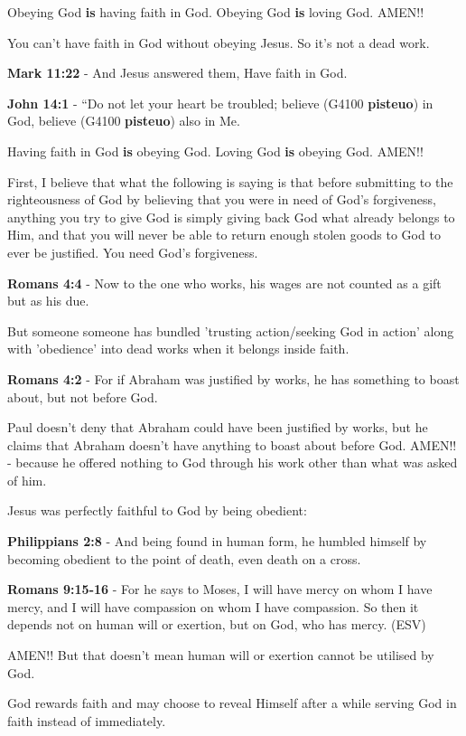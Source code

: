 \documentclass[11pt]{article}
\begin{document}
Obeying God \textbf{is} having faith in God. Obeying God \textbf{is} loving God. AMEN!!

You can't have faith in God without obeying Jesus. So it's not a dead work.

\textbf{Mark 11:22} - And Jesus answered them, Have faith in God.

\textbf{John 14:1} - “Do not let your heart be troubled; believe (G4100 \textbf{pisteuo}) in God, believe (G4100 \textbf{pisteuo}) also in Me.

Having faith in God \textbf{is} obeying God. Loving God \textbf{is} obeying God. AMEN!!

First, I believe that what the following is saying is that before submitting to the righteousness of God by believing that you were in need of God's forgiveness,
anything you try to give God is simply giving back God what already belongs to Him, and that you will never be able to return enough stolen goods to God to ever be justified.
You need God's forgiveness.

\textbf{Romans 4:4} - Now to the one who works, his wages are not counted as a gift but as his due.

But someone someone has bundled 'trusting
action/seeking God in action' along with
'obedience' into dead works when it belongs inside
faith.

\textbf{Romans 4:2} - For if Abraham was justified by works, he has something to boast about, but not before God.

Paul doesn't deny that Abraham could have been
justified by works, but he claims that Abraham
doesn't have anything to boast about before
God. AMEN!! - because he offered nothing to God through his work other than what was asked of him.

Jesus was perfectly faithful to God by being obedient:

\textbf{Philippians 2:8} - And being found in human form, he humbled himself by becoming obedient to the point of death, even death on a cross.

\textbf{Romans 9:15-16} - For he says to Moses, I will have mercy on whom I have mercy, and I will have compassion on whom I have compassion. So then it depends not on human will or exertion, but on God, who has mercy. (ESV)

AMEN!! But that doesn't mean human will or exertion cannot be utilised by God.

God rewards faith and may choose to reveal Himself after a while serving God in faith instead of immediately.
\end{document}
